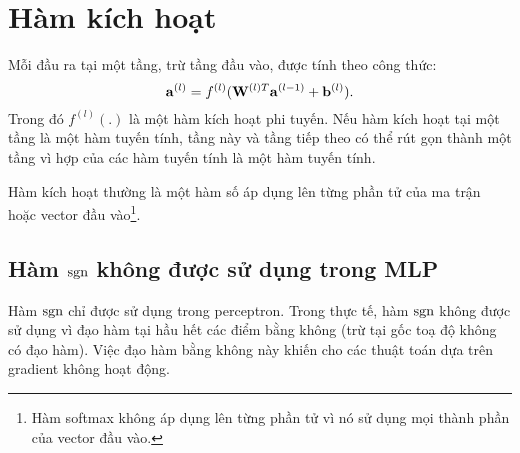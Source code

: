 \section{Hàm kích hoạt}


Mỗi đầu ra tại một tầng, trừ tầng đầu vào, được tính theo công thức:
\begin{equation}
\mathbf{a}^{(l)} = f^{(l)}(\mathbf{W}^{(l)T}\mathbf{a}^{(l-1)} + \mathbf{b}^{(l)}).
\end{equation}
Trong đó $f^{(l)}(.)$ là một hàm kích hoạt phi tuyến. Nếu hàm kích hoạt tại một
tầng là một hàm tuyến tính, tầng này và tầng tiếp theo có thể rút gọn thành
một tầng vì {hợp của các hàm tuyến tính là một hàm tuyến tính}.

Hàm kích hoạt thường là một hàm số áp dụng lên {từng phần tử} của ma trận
hoặc vector đầu vào\footnote{Hàm softmax không áp dụng lên từng phần tử vì nó sử dụng mọi thành phần của vector đầu vào.}.



\subsection{Hàm $\text{sgn}$ không được sử dụng trong MLP}

Hàm $\text{sgn}$ chỉ được sử dụng trong perceptron. Trong thực tế, hàm
$\text{sgn}$ không được sử dụng vì đạo hàm tại hầu hết các điểm bằng không (trừ
tại gốc toạ độ không có đạo hàm). Việc đạo hàm bằng không này khiến cho các thuật toán dựa trên gradient không hoạt động.

